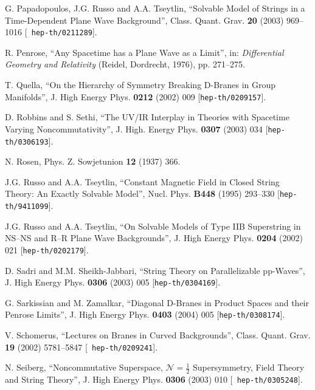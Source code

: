 \begin{thebibliography}{199}
 G. Papadopoulos, J.G. Russo and A.A. Tseytlin,
  ``Solvable Model of Strings in a Time-Dependent Plane Wave
  Background'', Class. Quant. Grav. {\bf 20} (2003) 969--1016 [{\tt
    hep-th/0211289}].

 R. Penrose, ``Any Spacetime has a Plane Wave as a
  Limit'', in: {\it Differential Geometry and Relativity} (Reidel,
  Dordrecht, 1976), pp. 271--275.

 T. Quella, ``On the Hierarchy of Symmetry Breaking
  D-Branes in Group Manifolds'', J. High Energy Phys. {\bf 0212}
  (2002) 009 [{\tt hep-th/0209157}].

 D. Robbins and S. Sethi, ``The UV/IR Interplay in
  Theories with Spacetime Varying Noncommutativity'', J. High. Energy
  Phys. {\bf 0307} (2003) 034 [{\tt hep-th/0306193}].

 N. Rosen, Phys. Z. Sowjetunion {\bf 12} (1937) 366.

 J.G. Russo and A.A. Tseytlin, ``Constant Magnetic Field
  in Closed String Theory: An Exactly Solvable Model'',
  Nucl. Phys. {\bf B448} (1995) 293--330 [{\tt hep-th/9411099}].

 J.G. Russo and A.A. Tseytlin, ``On Solvable Models of
  Type IIB Superstring in NS--NS and R--R Plane Wave Backgrounds'',
  J. High Energy Phys. {\bf 0204} (2002) 021 [{\tt hep-th/0202179}].

 D. Sadri and M.M. Sheikh-Jabbari, ``String Theory on
  Parallelizable pp-Waves'', J. High Energy Phys. {\bf 0306} (2003)
  005 [{\tt hep-th/0304169}].

 G. Sarkissian and M. Zamalkar, ``Diagonal D-Branes in
  Product Spaces and their Penrose Limits'', J. High Energy Phys. {\bf
    0403} (2004) 005 [{\tt hep-th/0308174}].

 V. Schomerus, ``Lectures on Branes in Curved
  Backgrounds'', Class. Quant. Grav. {\bf 19} (2002) 5781--5847 [{\tt
  hep-th/0209241}].

 N. Seiberg, ``Noncommutative Superspace,
  $\mathcal{N}=\frac12$ Supersymmetry, Field Theory and String
  Theory'', J. High Energy Phys. {\bf 0306} (2003) 010 [{\tt
    hep-th/0305248}].


\end{thebibliography}
